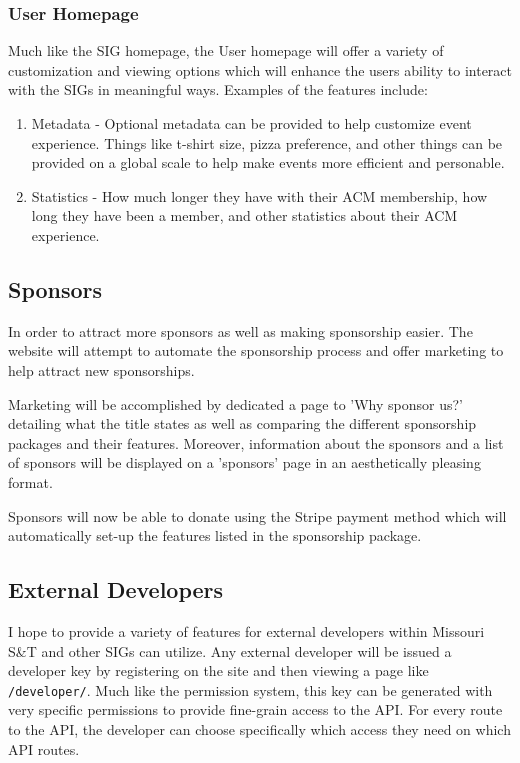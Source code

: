 \documentclass{article}
\begin{document}
\subsubsection{User Homepage}
Much like the SIG homepage, the User homepage will offer a variety of customization and
viewing options which will enhance the users ability to interact with the SIGs in
meaningful ways. Examples of the features include:
\begin{enumerate}
    \item Metadata - Optional metadata can be provided to help customize event
          experience. Things like t-shirt size, pizza preference, and other things
          can be provided on a global scale to help make events more efficient
          and personable.
    \item Statistics - How much longer they have with their ACM membership, how
          long they have been a member, and other statistics about their ACM
          experience.
\end{enumerate}

\subsection{Sponsors}
In order to attract more sponsors as well as making sponsorship easier. The website
will attempt to automate the sponsorship process and offer marketing to help
attract new sponsorships.

Marketing will be accomplished by dedicated a page to 'Why sponsor us?' detailing
what the title states as well as comparing the different sponsorship packages and
their features. Moreover, information about the sponsors and a list of sponsors
will be displayed on a 'sponsors' page in an aesthetically pleasing format.

Sponsors will now be able to donate using the Stripe payment method which will
automatically set-up the features listed in the sponsorship package. 
\subsection{External Developers}
I hope to provide a variety of features for external developers within
Missouri S\&T and other SIGs can utilize. Any external developer will be
issued a developer key by registering on the site and then viewing a page
like \texttt{/developer/}. Much like the permission system, this key can be
generated with very specific permissions to provide fine-grain access to the API.
For every route to the API, the developer can choose specifically which
access they need on which API routes.
\end{document}

